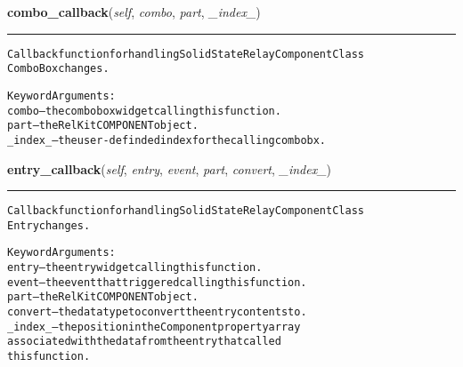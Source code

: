     \vspace{0.5ex}

\hspace{.8\funcindent}\begin{boxedminipage}{\funcwidth}

    \raggedright \textbf{combo\_callback}(\textit{self}, \textit{combo}, \textit{part}, \textit{\_index\_})

    \vspace{-1.5ex}

    \rule{\textwidth}{0.5\fboxrule}
\setlength{\parskip}{2ex}
\begin{alltt}
Callback function for handling Solid State Relay Component Class
ComboBox changes.

Keyword Arguments:
  combo -- the combobox widget calling this function.
   part -- the RelKit COMPONENT object.
\_index\_ -- the user-definded index for the calling combobx.
\end{alltt}

\setlength{\parskip}{1ex}
    \end{boxedminipage}

    \label{reliafree:relays:relay:SolidState:entry_callback}

    \vspace{0.5ex}

\hspace{.8\funcindent}\begin{boxedminipage}{\funcwidth}

    \raggedright \textbf{entry\_callback}(\textit{self}, \textit{entry}, \textit{event}, \textit{part}, \textit{convert}, \textit{\_index\_})

    \vspace{-1.5ex}

    \rule{\textwidth}{0.5\fboxrule}
\setlength{\parskip}{2ex}
\begin{alltt}
Callback function for handling Solid State Relay Component Class
Entry changes.

Keyword Arguments:
  entry -- the entry widget calling this function.
  event -- the event that triggered calling this function.
   part -- the RelKit COMPONENT object.
convert -- the data type to convert the entry contents to.
\_index\_ -- the position in the Component property array
           associated with the data from the entry that called
           this function.
\end{alltt}

\setlength{\parskip}{1ex}
    \end{boxedminipage}

